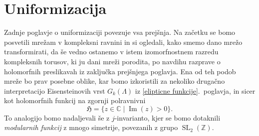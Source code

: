 \documentclass[mat1]{fmfdelo}
\numberwithin{equation}{section}
\newcommand{\Z}{\mathbb Z}
\newcommand{\C}{\mathbb C}
\newcommand{\HH}{\mathfrak{H}}
\newcommand{\CM}{\mathbb C ^*}
\newcommand{\htp}{\simeq}
\renewcommand\Im{\operatorname{Im}}%
\newcommand{\olsi}[1]{\,\overline{\!{#1}}} %
\newcommand{\kom}[1]{
    \underline{//#1}
}
\theoremstyle{definition}
\begin{document}









\section{Uniformizacija} \label{poglavje izomorfizem}

Zadnje poglavje o uniformizaciji povezuje vsa prejšnja. Na začetku 
%
%
se bomo posvetili mrežam v kompleksni ravnini in si ogledali, kako smemo dano mrežo transformirati, da še vedno ostanemo v istem izomorfnostnem razredu kompleksnih torusov, ki ju dani mreži porodita, po navdihu razprave o holomorfnih preslikavah iz zaključka prejšnjega poglavja. Ena od teh podob mreže bo prav posebne oblike, kar bomo izkoristili za nekoliko drugačno interpretacijo Eisensteinovih vrst $G_k(\Lambda)$ iz \ref{elipticne funkcije}.\ poglavja, in sicer kot holomorfnih funkcij na zgornji polravnivni
\[
    \HH = \{z \in \C \mid \Im(z) > 0\}.
\]
To analogijo bomo nadaljevali še z $j$-invarianto, kjer se bomo dotaknili \emph{modularnih funkcij} z mnogo simetrije, povezanih z grupo $\operatorname{SL}_2(\Z)$.
\end{document}
